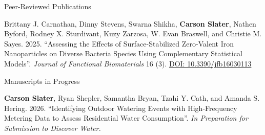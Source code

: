 \documentclass{resume} %
\newenvironment{pubentry}{\begin{list}{}{\setlength{\leftmargin}{1.5em}\setlength{\itemindent}{-1.5em}\setlength{\itemsep}{0pt}\setlength{\parsep}{0pt}\setlength{\topsep}{0pt}}\item[]}{\end{list}}
\begin{document}
\begin{rSection}{Peer-Reviewed Publications}

\begin{pubentry}Brittany J. Carnathan, Dinny Stevens, Swarna Shikha, \textbf{Carson Slater}, Nathen Byford, Rodney X. Sturdivant, Kuzy Zarzosa, W. Evan Braswell, and Christie M. Sayes. 2025. ``Assessing the Effects of Surface-Stabilized Zero-Valent Iron Nanoparticles on Diverse Bacteria Species Using Complementary Statistical Models''. \textit{Journal of Functional Biomaterials} 16 (3). \href{https://doi.org/10.3390/jfb16030113}{DOI: 10.3390/jfb16030113}
\end{pubentry}

\end{rSection}

\begin{rSection}{Manuscripts in Progress}

\begin{pubentry}\textbf{Carson Slater}, Ryan Shepler, Samantha Bryan, Tzahi Y. Cath, and Amanda S. Hering. 2026. ``Identifying Outdoor Watering Events with High-Frequency Metering Data to Assess Residential Water Consumption''. \textit{In Preparation for Submission to Discover Water.}
\end{pubentry}

\end{rSection}
\end{document}
